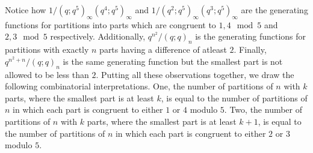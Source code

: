 Notice how $1/(q;q^5)_\infty(q^4;q^5)_\infty$ and $1/(q^2;q^5)_\infty(q^3;q^5)_\infty$ are the generating functions for partitions into parts which are congruent to $1,4\mod{5}$ and $2,3\mod{5}$ respectively. Additionally, $q^{n^2}/(q;q)_n$ is the generating functions for partitions with exactly $n$ parts having a difference of atleast $2$. Finally, $q^{n^2+n}/(q;q)_n$ is the same generating function but the smallest part is not allowed to be less than $2$. Putting all these observations together, we draw the following combinatorial interpretations. One, the number of partitions of \( n \) with \( k \) parts, where the smallest part is at least \( k \), is equal to the number of partitions of \( n \) in which each part is congruent to either \( 1 \) or \( 4 \) modulo \( 5 \). Two, the number of partitions of \( n \) with \( k \) parts, where the smallest part is at least \( k+1 \), is equal to the number of partitions of \( n \) in which each part is congruent to either \( 2 \) or \( 3 \) modulo \( 5 \).
\endinput
